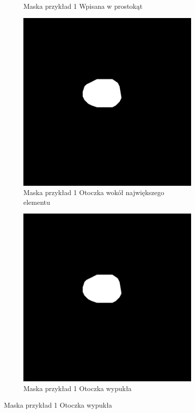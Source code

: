 \documentclass[a4paper,11pt,twoside]{report}
\theoremstyle{definition}
\begin{document}
\begin{figure}[htb]
\begin{subfigure}{0.25\textwidth}
		\caption{Maska przykład 1 Wpisana w prostokąt}
		\label{fig:2}
	\end{subfigure}\hfil %
	
	\medskip
	\begin{subfigure}{0.25\textwidth}
		\includegraphics[width=\linewidth]{Mask/1/hull.png}
		\caption{Maska przykład 1 Otoczka wokół największego elementu}
		\label{fig:3}
	\end{subfigure}\hfil %
	\begin{subfigure}{0.25\textwidth}
		\includegraphics[width=\linewidth]{Mask/1/hull.png}
		\caption{Maska przykład 1 Otoczka wypukła}
		\label{fig:4}
	\end{subfigure}\hfil %


\end{figure}
\end{document}
